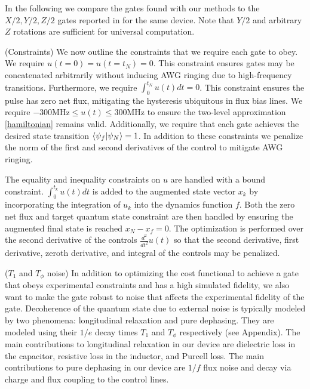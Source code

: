 \documentclass[
  amsfonts,
  amsmath,
  tbtags,
  amssymb,
  aps,
  nobibnotes,
  prl,
  twocolumn,
]{revtex4-2}
\begin{document}
In the following we compare the gates found with our methods
to the $X/2, Y/2, Z/2$ gates reported in \cite{zhang2020universal}
for the same device. Note that $Y/2$ and arbitrary $Z$ rotations
are sufficient for universal computation.

(Constraints) We now outline the constraints that we require each gate
to obey.
We require $u(t = 0) = u(t = t_{N}) = 0$.
This constraint ensures gates may be concatenated arbitrarily without
inducing AWG ringing due to high-frequency transitions.
Furthermore, we require $\int_{0}^{t_{N}} u(t) dt = 0$. This
constraint ensures the pulse has zero net flux, mitigating
the hysteresis ubiquitous in flux bias lines.
We require $-300 \textrm{MHz} \le u(t) \le 300 \textrm{MHz}$
to ensure the two-level approximation \ref{hamiltonian}
remains valid. Additionally, we require that each gate achieves
the desired state transition $\braket{\psi_{f} \lvert \psi_{N}} = 1$.
In addition to these constraints we penalize the norm
of the first and second derivatives of the control
to mitigate AWG ringing.

The equality and inequality constraints on $u$ are handled
with a bound constraint. $\int_{0}^{t_{k}} u(t) dt$ is added
to the augmented state vector $x_{k}$ by incorporating the
integration of $u_{k}$ into the dynamics function $f$.
Both the zero net flux and target quantum state constraint
are then handled by ensuring the augmented final state is
reached $x_{N} - x_{f} = 0$. The optimization is performed
over the second derivative of the controls $\frac{d^{2}}{dt^{2}} u(t)$
so that the second derivative, first derivative, zeroth derivative, and
integral of the controls may be penalized.

($T_{1}$ and $T_{\phi}$ noise)
In addition to optimizing the cost functional to achieve a gate
that obeys experimental constraints and has a high simulated fidelity,
we also want to make the gate robust to noise that affects the experimental
fidelity of the gate. Decoherence of the quantum state due to external noise
is typically modeled by two phenomena: longitudinal relaxation and pure dephasing.
They are modeled using their $1/e$ decay times $T_{1}$ and $T_{\phi}$ respectively
(see Appendix).
The main contributions to longitudinal relaxation in our
device are dielectric loss in the capacitor, resistive loss in the inductor,
and Purcell loss. The main contributions to pure dephasing in our
device are $1/f$ flux noise and decay via charge and flux coupling
to the control lines.
\end{document}
